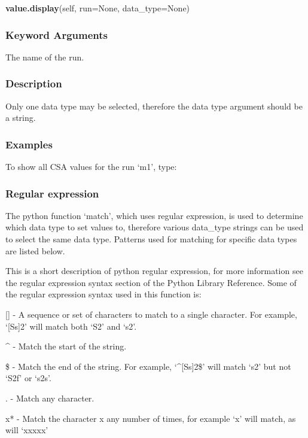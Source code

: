 \textsf{\textbf{value.display}(self, run=None, data\_type=None)}


\subsubsection{Keyword Arguments}

  The name of the run.


\subsubsection{Description}

Only one data type may be selected, therefore the data type argument should be a string.


\subsubsection{Examples}

To show all CSA values for the run `m1', type:




\subsubsection{Regular expression}

The python function `match', which uses regular expression, is used to determine which data
type to set values to, therefore various data\_type strings can be used to select the same
data type.  Patterns used for matching for specific data types are listed below.

This is a short description of python regular expression, for more information see the
regular expression syntax section of the Python Library Reference.  Some of the regular
expression syntax used in this function is:

    [] - A sequence or set of characters to match to a single character.  For example,
    `[Ss]2' will match both `S2' and `s2'.

    \^{} - Match the start of the string.

    \$ - Match the end of the string.  For example, `\^{}[Ss]2\$' will match `s2' but not `S2f'
    or `s2s'.

    . - Match any character.

    x* - Match the character x any number of times, for example `x' will match, as will
    `xxxxx'

